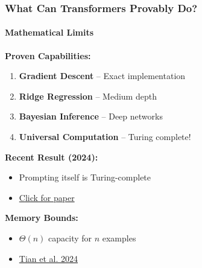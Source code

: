 \documentclass[10pt,aspectratio=169]{beamer}
\begin{document}

\begin{frame}
\frametitle{What Can Transformers Provably Do?}
\framesubtitle{Mathematical Limits}

\textbf{Proven Capabilities:}
\begin{enumerate}
    \item \textbf{Gradient Descent} -- Exact implementation
    \item \textbf{Ridge Regression} -- Medium depth
    \item \textbf{Bayesian Inference} -- Deep networks
    \item \textbf{Universal Computation} -- Turing complete!
\end{enumerate}

\vspace{0.5cm}
\textbf{Recent Result (2024):}
\begin{itemize}
    \item Prompting itself is Turing-complete
    \item \href{run:./papers/2411.01992_prompting_turing_complete.pdf}{\color{blue}Click for paper}
\end{itemize}

\vspace{0.5cm}
\textbf{Memory Bounds:}
\begin{itemize}
    \item $\Theta(n)$ capacity for $n$ examples
    \item \href{run:./papers/2405.13718_memory_capacity.pdf}{\color{blue}Tian et al. 2024}
\end{itemize}
\end{frame}

\end{document}
